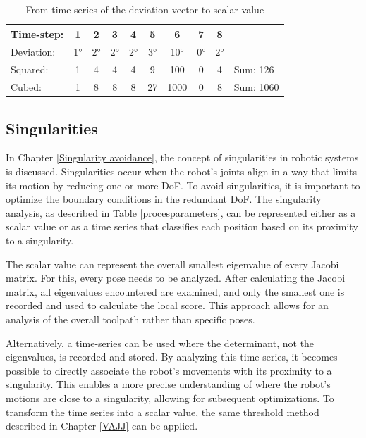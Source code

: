 \begin{table}[H]
	\centering
	\begin{tabular}{||l|c|c|c|c|c|c|c|c|l||}
		\hline
		Time-step:  & 1 & 2& 3& 4& 5& 6& 7& 8&  \\
		\hline
		Deviation:  & 1° & 2°& 2°& 2°& 3°& 10°& 0°& 2°&  \\
		\hline
		\hline
		Squared:  & 1 & 4& 4& 4& 9& 100& 0& 4& Sum: 126  \\
		Cubed:  & 1 & 8& 8& 8& 27& 1000& 0& 8& Sum: 1060  \\
		\hline
		\hline
		
	\end{tabular}
	
	\caption{From time-series of the deviation vector to scalar value}
	\label{deviation}
\end{table}

 

\subsection{Singularities}

In Chapter \ref{Singularity avoidance}, the concept of singularities in robotic systems is discussed. Singularities occur when the robot's joints align in a way that limits its motion by reducing one or more \acrshort{DoF}. To avoid singularities, it is important to optimize the boundary conditions in the redundant \acrshort{DoF}. The singularity analysis, as described in Table \ref{procesparameters}, can be represented either as a scalar value or as a time series that classifies each position based on its proximity to a singularity.

The scalar value can represent the overall smallest eigenvalue of every Jacobi matrix. For this, every pose needs to be analyzed. After calculating the Jacobi matrix, all eigenvalues encountered are examined, and only the smallest one is recorded and used to calculate the local score. This approach allows for an analysis of the overall toolpath rather than specific poses.

Alternatively, a time-series can be used where the determinant, not the eigenvalues, is recorded and stored. By analyzing this time series, it becomes possible to directly associate the robot's movements with its proximity to a singularity. This enables a more precise understanding of where the robot's motions are close to a singularity, allowing for subsequent optimizations. To transform the time series into a scalar value, the same threshold method described in Chapter \ref{VAJJ} can be applied.
  
